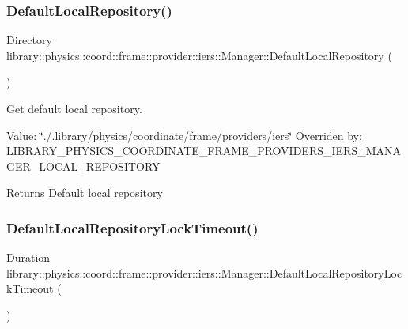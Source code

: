 \subsubsection{\texorpdfstring{Default\+Local\+Repository()}{DefaultLocalRepository()}}
{\footnotesize\ttfamily Directory library\+::physics\+::coord\+::frame\+::provider\+::iers\+::\+Manager\+::\+Default\+Local\+Repository (\begin{DoxyParamCaption}{ }\end{DoxyParamCaption})\hspace{0.3cm}{\ttfamily [static]}}



Get default local repository. 

Value\+: \char`\"{}./.\+library/physics/coordinate/frame/providers/iers\char`\"{} Overriden by\+: L\+I\+B\+R\+A\+R\+Y\+\_\+\+P\+H\+Y\+S\+I\+C\+S\+\_\+\+C\+O\+O\+R\+D\+I\+N\+A\+T\+E\+\_\+\+F\+R\+A\+M\+E\+\_\+\+P\+R\+O\+V\+I\+D\+E\+R\+S\+\_\+\+I\+E\+R\+S\+\_\+\+M\+A\+N\+A\+G\+E\+R\+\_\+\+L\+O\+C\+A\+L\+\_\+\+R\+E\+P\+O\+S\+I\+T\+O\+RY

\begin{DoxyReturn}{Returns}
Default local repository 
\end{DoxyReturn}
\mbox{\label{classlibrary_1_1physics_1_1coord_1_1frame_1_1provider_1_1iers_1_1_manager_a63300991a534897cc3e850e58876f62b}} 
\subsubsection{\texorpdfstring{Default\+Local\+Repository\+Lock\+Timeout()}{DefaultLocalRepositoryLockTimeout()}}
{\footnotesize\ttfamily \hyperlink{classlibrary_1_1physics_1_1time_1_1_duration}{Duration} library\+::physics\+::coord\+::frame\+::provider\+::iers\+::\+Manager\+::\+Default\+Local\+Repository\+Lock\+Timeout (\begin{DoxyParamCaption}{ }\end{DoxyParamCaption})\hspace{0.3cm}{\ttfamily [static]}}




